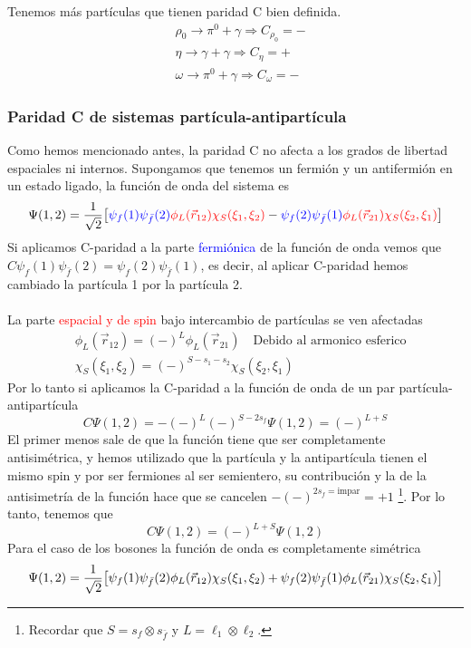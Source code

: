 \noindent Tenemos más partículas que tienen paridad C bien definida. 
\begin{equation*}
    \begin{aligned}
        &\rho_0\longrightarrow \pi^0+\gamma \Rightarrow C_{\rho_0}=- \\
        & \eta \longrightarrow \gamma+\gamma \Rightarrow C_{\eta}=+\\
        &\omega \longrightarrow \pi^0 +\gamma \Rightarrow C_{\omega}=-
    \end{aligned}
\end{equation*}
\subsubsection{Paridad C de sistemas partícula-antipartícula}
Como hemos mencionado antes, la paridad C no afecta a los grados de libertad espaciales ni internos. Supongamos que tenemos un fermión y un antifermión en un estado ligado, la función de onda del sistema es
\begin{equation}
    \Psi(1,2)=\frac{1}{\sqrt{2}} \qty[\textcolor{blue}{\psi_f (1)\psi_{\bar{f}} (2) }\textcolor{red}{\phi_L(\vec{r}_{12}) \chi_S(\xi_1,\xi_2)}-\textcolor{blue}{\psi_f (2)\psi_{\bar{f}} (1)}\textcolor{red}{ \phi_L(\vec{r}_{21}) \chi_S(\xi_2,\xi_1)}]
\end{equation}
Si aplicamos C-paridad a la parte \textcolor{blue}{fermiónica} de la función de onda vemos que $C\psi_f (1)\psi_{\bar{f}} (2)= \psi_f (2)\psi_{\bar{f}} (1)$, es decir, al aplicar C-paridad hemos cambiado la partícula 1 por la partícula 2. \\\\
La parte \textcolor{red}{espacial y de spin} bajo intercambio de partículas se ven afectadas
\begin{equation*}
    \begin{aligned}
        &\phi_L(\vec{r}_{12})=(-)^L \phi_L(\vec{r}_{21}) \quad \text{Debido al armonico esferico} \\
        & \chi_S(\xi_1,\xi_2)= (-)^{S-s_1-s_2} \chi_S(\xi_2,\xi_1)
    \end{aligned}
\end{equation*}
Por lo tanto si aplicamos la C-paridad a la función de onda de un par partícula-antipartícula $$C\Psi(1,2)=-(-)^L(-)^{S-2s_f}\Psi(1,2)=(-)^{L+S}$$
El primer menos sale de que la función tiene que ser completamente antisimétrica, y hemos utilizado que la partícula y la antipartícula tienen el mismo spin y por ser fermiones al ser semientero, su contribución y la de la antisimetría de la función hace que se cancelen $-(-)^{2s_f=\text{impar}}=+1$ \footnote{Recordar que $S=s_f \otimes s_{\bar{f}}$ y $L=\ell_1 \otimes \ell_2$.}. Por lo tanto, tenemos que 
\begin{equation}
    C\Psi(1,2)=(-)^{L+S} \Psi(1,2)
\end{equation}
Para el caso de los bosones la función de onda es completamente simétrica
\begin{equation}
    \Psi(1,2) = \frac{1}{\sqrt{2}} \qty[\psi_f (1)\psi_{\bar{f}} (2) \phi_L(\vec{r}_{12}) \chi_S(\xi_1,\xi_2) + \psi_f (2)\psi_{\bar{f}} (1) \phi_L(\vec{r}_{21}) \chi_S(\xi_2,\xi_1)]
\end{equation}

